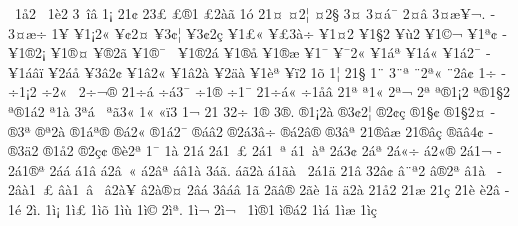 {^^ad^^a01^^e52
^^ad^^a01^^e82
3^^ad^^a0^^ee^^e2
^^ad1^^a1
2^^ad1^^a2
2^^ad3^^a3
^^ad^^a3^^ae1
^^ad^^a32^^e0^^e3
^^ad1^^f3
2^^ad1^^a4
^^ad^^a42^^a6
^^ad^^a42^^a7
^^ad3^^a4^^ad
^^ad3^^a4^^e1^^af
^^ad2^^a4^^e2
^^ad3^^a4^^e6^^a5^^ac.
^^ad3^^a4^^e6^^f7
1^^ad^^a5
^^ad^^a51^^a12^^ab
^^ad^^a5^^a22^^a4
^^ad^^a53^^a2^^a6
^^ad^^a53^^a22^^e7
^^ad^^a51^^a3^^ab
^^ad^^a5^^a33^^e0^^f7
^^ad^^a51^^a42
^^ad^^a51^^a72
^^ad^^a5^^f92
^^ad^^a51^^a9^^ac
^^ad^^a51^^aa^^a2
^^ad^^a51^^ae2^^a1
^^ad^^a51^^ae^^a4
^^ad^^a5^^ae2^^ad^^e3
^^ad^^a51^^ae^^af^^a0
^^ad^^a51^^ae2^^e1
^^ad^^a51^^ae^^e5
^^ad^^a51^^ae^^e6
^^ad^^a51^^af
^^ad^^a5^^af2^^ab
^^ad^^a51^^e1^^aa
^^ad^^a51^^e1^^ab
^^ad^^a51^^e12^^af
^^ad^^a51^^e1^^e2^^ef
^^ad^^a52^^e1^^e5
^^ad^^a53^^e22^^a2
^^ad^^a51^^e22^^ab
^^ad^^a51^^e22^^e0
^^ad^^a52^^e4^^e0
^^ad^^a51^^e8^^aa
^^ad^^a5^^ef2
1^^ad^^f5
^^ad1^^a6
2^^ad1^^a7
1^^ad^^a8
3^^ad^^a8^^aa
^^ad^^a82^^aa^^ab
^^ad^^a82^^e2^^a2
1^^ad^^f7
^^ad^^f71^^a12
^^ad^^f72^^ab^^a0
2^^ad^^f7^^ac^^ae
2^^ad1^^f7^^ad^^e1
^^ad^^f7^^ad^^e13^^af
^^ad^^f71^^ae
^^ad^^f71^^af
2^^ad1^^f7^^e1^^ab
^^ad^^f71^^e5^^e2
2^^ad1^^aa
^^ad^^aa1^^ab
^^ad2^^aa^^ac
^^ad2^^aa^^ad
^^ad^^aa^^ae1^^a12
^^ad^^aa^^ae1^^a72
^^ad^^aa^^ae1^^e12
^^ad^^aa1^^e0
^^ad3^^aa^^e1^^a0
^^ad^^aa^^e33^^ab
^^ad1^^ab
^^ad^^ab^^ef3
^^ad1^^ac
2^^ad1^^ad
^^ad3^^ad2^^f7
1^^ad^^ae
3^^ad^^ae.
^^ad^^ae1^^a12^^e0
^^ad^^ae3^^a22^^a6
^^ad^^ae2^^a2^^e7
^^ad^^ae1^^a7^^a2
^^ad^^ae1^^a72^^a4
^^ad^^ae3^^aa^^ad
^^ad^^ae^^aa2^^e0
^^ad^^ae1^^e1^^aa^^ae
^^ad^^ae^^e12^^ab
^^ad^^ae1^^e12^^af
^^ad^^ae^^e1^^e22
^^ad^^ae2^^e13^^e2^^f7
^^ad^^ae^^e12^^e2^^ae
^^ad^^ae3^^e2^^aa
2^^ad1^^ae^^e2^^e6
2^^ad1^^ae^^e2^^e7
^^ad^^ae^^e3^^e24^^a2
^^ad^^ae3^^e42
^^ad^^ae1^^e52
^^ad^^ae2^^e7^^a2
^^ad^^ae^^e82^^aa
^^ad1^^af
^^ad1^^e0
2^^ad1^^e1
^^ad2^^e11^^a0^^a3
^^ad2^^e11^^a0^^aa
^^ad^^e11^^a0^^e0^^aa
^^ad2^^e13^^a2
^^ad2^^e1^^aa
^^ad2^^e1^^ab^^f7
^^ad^^e12^^ab^^ae
^^ad2^^e11^^ac
^^ad2^^e11^^ae^^aa
^^ad2^^e1^^e1
^^ad^^e11^^e2
^^ad^^e12^^e2^^a0^^ab
^^ad^^e12^^e2^^aa
^^ad^^e1^^e21^^e0
^^ad3^^e1^^e3.
^^ad^^e1^^e32^^e0
^^ad^^e11^^e3^^e0^^a0
^^ad2^^e11^^e4
2^^ad1^^e2
3^^ad2^^e2^^a2
^^ad^^e2^^a8^^aa2
^^ad^^e2^^ae2^^aa
^^ad^^e21^^e0^^a0
^^ad2^^e2^^e01^^a0^^a3
^^ad^^e2^^e01^^a0^^e2^^a0
^^ad^^e22^^e0^^a5
^^ad^^e22^^e0^^ae^^a4
^^ad2^^e2^^e1
^^ad3^^e2^^e1^^e2
1^^ad^^e3
2^^ad^^e3^^e2^^ae
2^^ad^^e3^^e8
^^ad1^^e4
^^ad^^e42^^e0
2^^ad1^^e52
2^^ad1^^e6
2^^ad1^^e7
2^^ad1^^e8
^^ad^^e82^^e2
^^ad1^^e9
2^^ad^^ec.
1^^ad^^ec^^a1
1^^ad^^ec^^a3
1^^ad^^ec^^f5
1^^ad^^ec^^f9
1^^ad^^ec^^a9
2^^ad^^ec^^aa.
1^^ad^^ec^^ac
2^^ad^^ec^^ac^^a0
1^^ad^^ec^^ae1
^^ad^^ec^^ae^^e12
1^^ad^^ec^^e1
1^^ad^^ec^^e6
1^^ad^^ec^^e7
}
